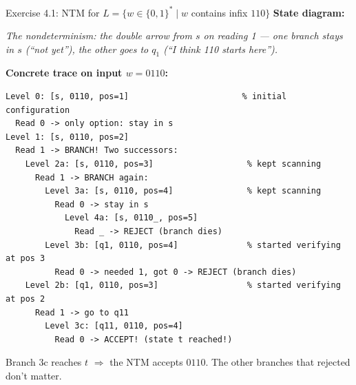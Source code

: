 \documentclass[11pt,a4paper]{article}
\begin{document}
\begin{examplebox}{{Exercise 4.1: NTM for $L = \{w \in \{0,1\}^* \mid w$ contains infix $110\}$}}
\textbf{State diagram:}
\begin{center}
\end{center}

\textit{The nondeterminism: the double arrow from $s$ on reading 1 --- one branch stays in $s$ (``not yet''), the other goes to $q_1$ (``I think 110 starts here'').}

\textbf{Concrete trace on input $w = 0110$:}

\begin{lstlisting}
Level 0: [s, 0110, pos=1]                       % initial configuration
  Read 0 -> only option: stay in s
Level 1: [s, 0110, pos=2]
  Read 1 -> BRANCH! Two successors:
    Level 2a: [s, 0110, pos=3]                   % kept scanning
      Read 1 -> BRANCH again:
        Level 3a: [s, 0110, pos=4]               % kept scanning
          Read 0 -> stay in s
            Level 4a: [s, 0110_, pos=5]
              Read _ -> REJECT (branch dies)
        Level 3b: [q1, 0110, pos=4]              % started verifying at pos 3
          Read 0 -> needed 1, got 0 -> REJECT (branch dies)
    Level 2b: [q1, 0110, pos=3]                  % started verifying at pos 2
      Read 1 -> go to q11
        Level 3c: [q11, 0110, pos=4]
          Read 0 -> ACCEPT! (state t reached!)
\end{lstlisting}

Branch 3c reaches $t$ $\Rightarrow$ the NTM accepts $0110$. The other branches that rejected don't matter.


\end{examplebox}
\end{document}
